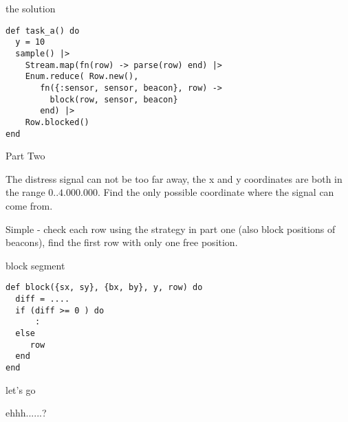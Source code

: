 \begin{frame}[fragile]{the solution}


\begin{verbatim}
def task_a() do 
  y = 10
  sample() |> 
    Stream.map(fn(row) -> parse(row) end) |> 
    Enum.reduce( Row.new(), 
       fn({:sensor, sensor, beacon}, row) ->
         block(row, sensor, beacon}
       end) |>
    Row.blocked()
end
\end{verbatim}

\end{frame}

\begin{frame}{Part Two}

  The distress signal can not be too far away, the x and y coordinates
  are both in the range $0..4.000.000$. Find the only possible
  coordinate where the signal can come from.

  
  \vspace{20pt}\pause Simple - check each row using the strategy in
  part one (also block positions of beacons), find the first row with
  only one free position.

\end{frame}


\begin{frame}[fragile]{block segment}

  \begin{verbatim}
def block({sx, sy}, {bx, by}, y, row) do
  diff = ....
  if (diff >= 0 ) do
      :
  else
     row
  end
end
\end{verbatim}
  
\end{frame}

\begin{frame}{let's go}


  \vspace{20pt}\pause ehhh......?
  
\end{frame}






